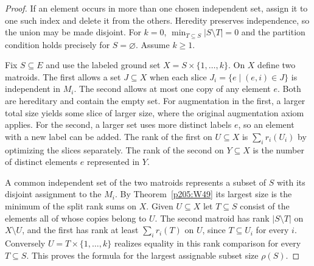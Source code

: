 \documentclass[11pt,oneside,openany]{book}
\theoremstyle{plain}
\theoremstyle{definition}
\theoremstyle{remark}
\begin{document}
\begin{proof}
If an element occurs in more than one chosen independent set,
assign it to one such index and delete it from the others.
Heredity preserves independence, so the union may be made disjoint.
For \(k=0\), \(\min_{T\subseteq S}|S\setminus T|=0\) and the
partition condition holds precisely for \(S=\varnothing\).
Assume \(k\ge1\).

Fix \(S\subseteq E\) and use the labeled ground set
\(X=S\times\{1,\ldots,k\}\). On \(X\) define two matroids.
The first allows a set \(J\subseteq X\) when each slice
\(J_i=\{e\mid(e,i)\in J\}\) is independent in \(M_i\).
The second allows at most one copy of any element \(e\).
Both are hereditary and contain the empty set.
For augmentation in the first, a larger total size yields
some slice of larger size, where the original augmentation
axiom applies. For the second, a larger set uses more distinct
labels \(e\), so an element with a new label can be added.
The rank of the first on \(U\subseteq X\) is \(\sum_i r_i(U_i)\)
by optimizing the slices separately. The rank of the second
on \(Y\subseteq X\) is the number of distinct elements \(e\)
represented in \(Y\).

A common independent set of the two matroids represents a
subset of \(S\) with its disjoint assignment to the \(M_i\).
By Theorem~\ref{p205:W49} its largest size is the minimum of
the split rank sums on \(X\). Given \(U\subseteq X\) let
\(T\subseteq S\) consist of the elements all of whose copies
belong to \(U\). The second matroid has rank \(|S\setminus T|\)
on \(X\setminus U\), and the first has rank at least
\(\sum_i r_i(T)\) on \(U\), since \(T\subseteq U_i\) for every
\(i\). Conversely \(U=T\times\{1,\ldots,k\}\) realizes equality
in this rank comparison for every \(T\subseteq S\). This proves
the formula for the largest assignable subset size \(\rho(S)\).


\end{proof}
\end{document}

